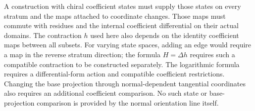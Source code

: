 A construction with chiral coefficient states must supply those states on every stratum and the maps attached to coordinate changes.
Those maps must commute with residues and the internal coefficient differential on their actual domains.
The contraction $h$ used here also depends on the identity coefficient maps between all subsets.
For varying state spaces, adding an edge would require a map in the reverse stratum direction;
the formula $H=\Delta h$ requires such a compatible contraction to be constructed separately.
The logarithmic formula requires a differential-form action and compatible coefficient restrictions.
Changing the base projection through normal-dependent tangential coordinates also requires an additional coefficient comparison.
No such state or base-projection comparison is provided by the normal orientation line itself.
